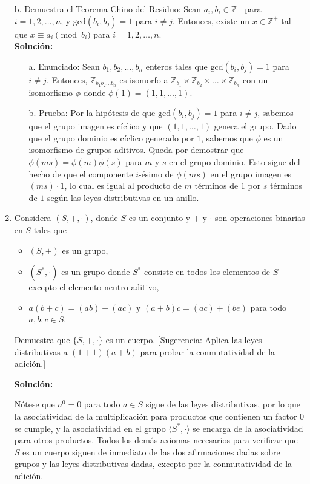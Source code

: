 \begin{enumerate}
	b. Demuestra el Teorema Chino del Residuo: Sean $a_i, b_i \in \mathbb{Z}^+$ para $i = 1, 2, \ldots, n$, y $\text{gcd}(b_i, b_j) = 1$ para $i \neq j$. Entonces, existe un $x \in \mathbb{Z}^+$ tal que $x \equiv a_i \pmod{b_i}$ para $i = 1, 2, \ldots, n$.
	\\ \textbf{Solución:}
	\begin{enumerate}
		\item[a.] Enunciado: Sean $b_1, b_2, \ldots, b_n$ enteros tales que $\text{gcd}(b_i, b_j) = 1$ para $i \neq j$. Entonces, $\mathbb{Z}_{b_1 b_2 \ldots b_n}$ es isomorfo a $\mathbb{Z}_{b_1} \times \mathbb{Z}_{b_2} \times \ldots \times \mathbb{Z}_{b_n}$ con un isomorfismo $\phi$ donde $\phi(1) = (1, 1, \ldots, 1)$.
		\item[b.] Prueba: Por la hipótesis de que $\text{gcd}(b_i, b_j) = 1$ para $i \neq j$, sabemos que el grupo imagen es cíclico y que $(1, 1, \ldots, 1)$ genera el grupo. Dado que el grupo dominio es cíclico generado por $1$, sabemos que $\phi$ es un isomorfismo de grupos aditivos. Queda por demostrar que $\phi(ms) = \phi(m)\phi(s)$ para $m$ y $s$ en el grupo dominio. Esto sigue del hecho de que el componente $i$-ésimo de $\phi(ms)$ en el grupo imagen es $(ms) \cdot 1$, lo cual es igual al producto de $m$ términos de $1$ por $s$ términos de $1$ según las leyes distributivas en un anillo.
	\end{enumerate}
	
	\item
	
	Considera $(S, +, \cdot)$, donde $S$ es un conjunto y $+$ y $\cdot$ son operaciones binarias en $S$ tales que
	\begin{itemize}
		\item $(S, +)$ es un grupo,
		\item $(S^*, \cdot)$ es un grupo donde $S^*$ consiste en todos los elementos de $S$ excepto el elemento neutro aditivo,
		\item $a(b + c) = (ab) + (ac)$ y $(a + b)c = (ac) + (be)$ para todo $a, b, c \in S$.
	\end{itemize}
	Demuestra que $\{S, +, \cdot\}$ es un cuerpo. [Sugerencia: Aplica las leyes distributivas a $(1 + 1)(a + b)$ para probar la conmutatividad de la adición.]
	
	\textbf{Solución:}
	
	Nótese que $a^0 = 0$ para todo $a \in S$ sigue de las leyes distributivas, por lo que la asociatividad de la multiplicación para productos que contienen un factor $0$ se cumple, y la asociatividad en el grupo $\langle S^*, \cdot \rangle$ se encarga de la asociatividad para otros productos. Todos los demás axiomas necesarios para verificar que $S$ es un cuerpo siguen de inmediato de las dos afirmaciones dadas sobre grupos y las leyes distributivas dadas, excepto por la conmutatividad de la adición.
	

\end{enumerate}
